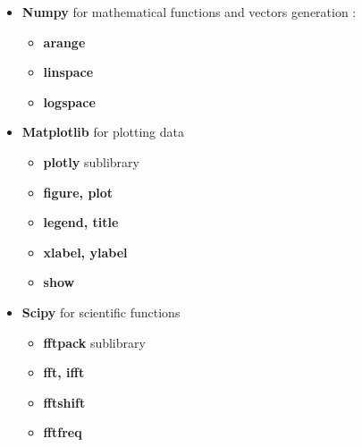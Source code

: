 
\begin{itemize}
	\item \textbf{Numpy} for mathematical functions and vectors generation :
	\begin{itemize}
		\item \textbf{arange}
		\item \textbf{linspace}
		\item \textbf{logspace}	
	\end{itemize}
	\item \textbf{Matplotlib} for plotting data
	\begin{itemize}
		\item \textbf{plotly} sublibrary
		\item \textbf{figure, plot}
		\item \textbf{legend, title}	
		\item \textbf{xlabel, ylabel}	
		\item \textbf{show}	
	\end{itemize}	
	\item \textbf{Scipy} for scientific functions
	\begin{itemize}
		\item \textbf{fftpack} sublibrary
		\item \textbf{fft, ifft}
		\item \textbf{fftshift}		
		\item \textbf{fftfreq}
	\end{itemize}
\end{itemize}
